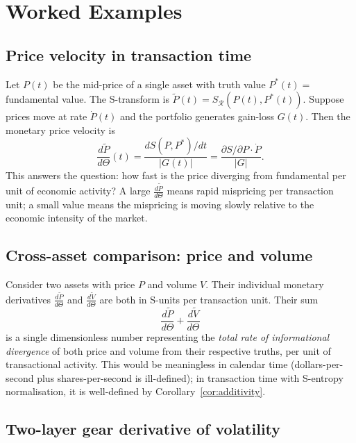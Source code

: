 \documentclass[twocolumn,11pt,a4paper]{article}
\theoremstyle{thmstyle}
\theoremstyle{definition}
\theoremstyle{remark}
\newcommand{\Gain}{G}                        %
\newcommand{\Clock}{\Theta}                  %
\newcommand{\Mdiff}[1]{\frac{d#1}{d\Clock}} %
\newcommand{\Sval}{S}                        %
\begin{document}
\section{Worked Examples}
\label{sec:examples}

\subsection{Price velocity in transaction time}

Let $P(t)$ be the mid-price of a single asset with truth
value $P^{*}(t)=$ fundamental value.  The S-transform is
$\tilde{P}(t) = \Sval_{\mathcal{R}}(P(t),P^{*}(t))$.
Suppose prices move at rate $\dot{P}(t)$ and the portfolio
generates gain-loss $\Gain(t)$.  Then the monetary price
velocity is
\begin{equation}
  \Mdiff{\tilde{P}}(t)
  = \frac{d\Sval(P,P^{*})/dt}{|\Gain(t)|}
  = \frac{\partial\Sval/\partial P \cdot \dot{P}}{|\Gain|}.
\end{equation}
This answers the question: how fast is the price diverging
from fundamental per unit of economic activity?  A large
$\Mdiff{\tilde{P}}$ means rapid mispricing per transaction
unit; a small value means the mispricing is moving slowly
relative to the economic intensity of the market.

\subsection{Cross-asset comparison: price and volume}

Consider two assets with price $P$ and volume $V$.  Their
individual monetary derivatives $\Mdiff{\tilde{P}}$ and
$\Mdiff{\tilde{V}}$ are both in S-units per transaction
unit.  Their sum
\begin{equation}
  \Mdiff{\tilde{P}} + \Mdiff{\tilde{V}}
\end{equation}
is a single dimensionless number representing the
\emph{total rate of informational divergence} of both
price and volume from their respective truths, per unit
of transactional activity.  This would be meaningless in
calendar time (dollars-per-second plus shares-per-second
is ill-defined); in transaction time with S-entropy
normalisation, it is well-defined by Corollary~\ref{cor:additivity}.

\subsection{Two-layer gear derivative of volatility}
\end{document}
